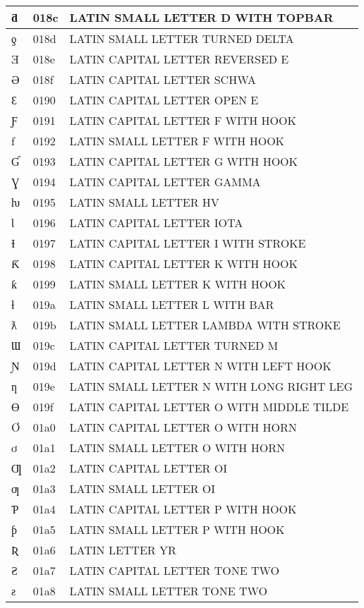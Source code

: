 \documentclass[12pt,letterpaper,openany]{book}
\begin{document}
\begin{center}
\begin{supertabular}{|m{0.25in}|m{0.5in}|m{4in}|}
ƌ & 018c & LATIN SMALL LETTER D WITH TOPBAR\\\hline
ƍ & 018d & LATIN SMALL LETTER TURNED DELTA\\\hline
Ǝ & 018e & LATIN CAPITAL LETTER REVERSED E\\\hline
Ə & 018f & LATIN CAPITAL LETTER SCHWA\\\hline
Ɛ & 0190 & LATIN CAPITAL LETTER OPEN E\\\hline
Ƒ & 0191 & LATIN CAPITAL LETTER F WITH HOOK\\\hline
ƒ & 0192 & LATIN SMALL LETTER F WITH HOOK\\\hline
Ɠ & 0193 & LATIN CAPITAL LETTER G WITH HOOK\\\hline
Ɣ & 0194 & LATIN CAPITAL LETTER GAMMA\\\hline
ƕ & 0195 & LATIN SMALL LETTER HV\\\hline
Ɩ & 0196 & LATIN CAPITAL LETTER IOTA\\\hline
Ɨ & 0197 & LATIN CAPITAL LETTER I WITH STROKE\\\hline
Ƙ & 0198 & LATIN CAPITAL LETTER K WITH HOOK\\\hline
ƙ & 0199 & LATIN SMALL LETTER K WITH HOOK\\\hline
ƚ & 019a & LATIN SMALL LETTER L WITH BAR\\\hline
ƛ & 019b & LATIN SMALL LETTER LAMBDA WITH STROKE\\\hline
Ɯ & 019c & LATIN CAPITAL LETTER TURNED M\\\hline
Ɲ & 019d & LATIN CAPITAL LETTER N WITH LEFT HOOK\\\hline
ƞ & 019e & LATIN SMALL LETTER N WITH LONG RIGHT LEG\\\hline
Ɵ & 019f & LATIN CAPITAL LETTER O WITH MIDDLE TILDE\\\hline
Ơ & 01a0 & LATIN CAPITAL LETTER O WITH HORN\\\hline
ơ & 01a1 & LATIN SMALL LETTER O WITH HORN\\\hline
Ƣ & 01a2 & LATIN CAPITAL LETTER OI\\\hline
ƣ & 01a3 & LATIN SMALL LETTER OI\\\hline
Ƥ & 01a4 & LATIN CAPITAL LETTER P WITH HOOK\\\hline
ƥ & 01a5 & LATIN SMALL LETTER P WITH HOOK\\\hline
Ʀ & 01a6 & LATIN LETTER YR\\\hline
Ƨ & 01a7 & LATIN CAPITAL LETTER TONE TWO\\\hline
ƨ & 01a8 & LATIN SMALL LETTER TONE TWO\\\hline

\end{supertabular}
\end{center}
\end{document}
